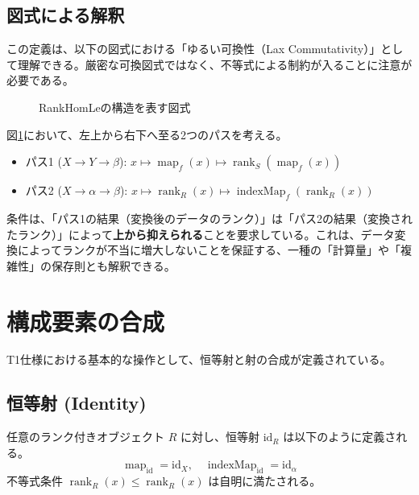 \documentclass[11pt, a4paper]{article}
\theoremstyle{definition}
\newcommand{\rank}{\operatorname{rank}}
\newcommand{\map}{\operatorname{map}}
\newcommand{\indexMap}{\operatorname{indexMap}}
\begin{document}
\subsection{図式による解釈}
この定義は、以下の図式における「ゆるい可換性（Lax Commutativity）」として理解できる。厳密な可換図式ではなく、不等式による制約が入ることに注意が必要である。

\begin{figure}[h]
\centering
{}
\caption{RankHomLeの構造を表す図式}
\label{fig:rankhomle}
\end{figure}

図\ref{fig:rankhomle}において、左上から右下へ至る2つのパスを考える。
\begin{itemize}
    \item パス1 ($X \to Y \to \beta$): $x \mapsto \map_f(x) \mapsto \rank_S(\map_f(x))$
    \item パス2 ($X \to \alpha \to \beta$): $x \mapsto \rank_R(x) \mapsto \indexMap_f(\rank_R(x))$
\end{itemize}
条件は、「パス1の結果（変換後のデータのランク）」は「パス2の結果（変換されたランク）」によって\textbf{上から抑えられる}ことを要求している。これは、データ変換によってランクが不当に増大しないことを保証する、一種の「計算量」や「複雑性」の保存則とも解釈できる。

\section{構成要素の合成}
T1仕様における基本的な操作として、恒等射と射の合成が定義されている。

\subsection{恒等射 (Identity)}
任意のランク付きオブジェクト $R$ に対し、恒等射 $\mathrm{id}_R$ は以下のように定義される。
\[
  \map_{\mathrm{id}} = \mathrm{id}_X, \quad \indexMap_{\mathrm{id}} = \mathrm{id}_\alpha
\]
不等式条件 $\rank_R(x) \le \rank_R(x)$ は自明に満たされる。
\end{document}
